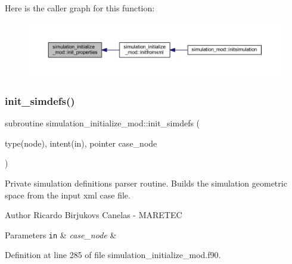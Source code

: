 Here is the caller graph for this function\+:
\nopagebreak
\begin{figure}[H]
\begin{center}
\leavevmode
\includegraphics[width=350pt]{namespacesimulation__initialize__mod_a7b30af4cf1a6ee74a4b2c6e8c9d1d98d_icgraph}
\end{center}
\end{figure}
\mbox{\label{namespacesimulation__initialize__mod_ae4a495136e5f02724a5cc456d5884281}} 
\subsubsection{\texorpdfstring{init\+\_\+simdefs()}{init\_simdefs()}}
{\footnotesize\ttfamily subroutine simulation\+\_\+initialize\+\_\+mod\+::init\+\_\+simdefs (\begin{DoxyParamCaption}\item[{type(node), intent(in), pointer}]{case\+\_\+node }\end{DoxyParamCaption})\hspace{0.3cm}{\ttfamily [private]}}



Private simulation definitions parser routine. Builds the simulation geometric space from the input xml case file. 

\begin{DoxyAuthor}{Author}
Ricardo Birjukovs Canelas -\/ M\+A\+R\+E\+T\+EC 
\end{DoxyAuthor}

\begin{DoxyParams}[1]{Parameters}
\mbox{\tt in}  & {\em case\+\_\+node} & \\
\hline
\end{DoxyParams}


Definition at line 285 of file simulation\+\_\+initialize\+\_\+mod.\+f90.


